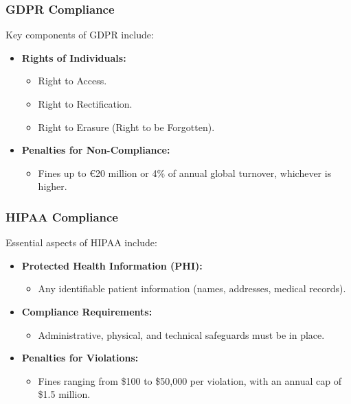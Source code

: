 \documentclass[aspectratio=169]{beamer}
\begin{document}
\begin{frame}[fragile]
    \frametitle{GDPR Compliance}
    Key components of GDPR include:
    \begin{itemize}
        \item \textbf{Rights of Individuals:}
            \begin{itemize}
                \item Right to Access.
                \item Right to Rectification.
                \item Right to Erasure (Right to be Forgotten).
            \end{itemize}
        \item \textbf{Penalties for Non-Compliance:}
            \begin{itemize}
                \item Fines up to €20 million or 4\% of annual global turnover, whichever is higher.
            \end{itemize}
    \end{itemize}
\end{frame}

\begin{frame}[fragile]
    \frametitle{HIPAA Compliance}
    Essential aspects of HIPAA include:
    \begin{itemize}
        \item \textbf{Protected Health Information (PHI):}
            \begin{itemize}
                \item Any identifiable patient information (names, addresses, medical records).
            \end{itemize}
        \item \textbf{Compliance Requirements:}
            \begin{itemize}
                \item Administrative, physical, and technical safeguards must be in place.
            \end{itemize}
        \item \textbf{Penalties for Violations:}
            \begin{itemize}
                \item Fines ranging from \$100 to \$50,000 per violation, with an annual cap of \$1.5 million.
            \end{itemize}
    \end{itemize}
\end{frame}
\end{document}
